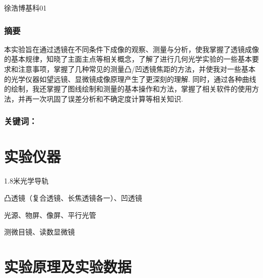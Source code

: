 \documentclass[UTF8]{ctexart}
\begin{document}
\renewcommand{\thefootnote}{\fnsymbol{footnote}}
\linespread{1.4}
\title{\vspace{-5em}\vspace{-2.5em}}
\date{}
\maketitle
\begin{center}
{\fangsong 徐浩博\quad 基科01}
\end{center}

\subsubsection*{摘要}
{\kaishu\normalsize  本实验旨在通过透镜在不同条件下成像的观察、测量与分析，使我掌握了透镜成像的基本规律，知晓了主面主点等相关概念，了解了进行几何光学实验的一些基本要求和注意事项，掌握了几种常见的测量凸/凹透镜焦距的方法，并使我对一些基本的光学仪器如望远镜、显微镜成像原理产生了更深刻的理解. 同时，通过各种曲线的绘制，我还掌握了图线绘制和测量的基本操作和方法，掌握了相关软件的使用方法，并再一次巩固了误差分析和不确定度计算等相关知识.}
\subsubsection*{关键词：\quad \vspace{1.5em}}


\section{实验仪器}
1.8米光学导轨\par
凸透镜（复合透镜、长焦透镜各一）、凹透镜\par
光源、物屏、像屏、平行光管\par
测微目镜、读数显微镜\par

\section{实验原理及实验数据}
\end{document}
